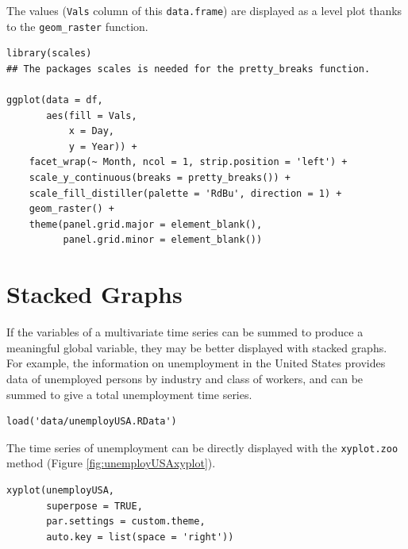 \documentclass[smallroyalvopaper]{memoir}
\begin{document}
The values (\texttt{Vals} column of this \texttt{data.frame}) are displayed as a level plot thanks to the \texttt{geom\_raster} function.
\lstset{language=r,label= ,caption= ,captionpos=b,numbers=none}
\begin{lstlisting}
library(scales) 
## The packages scales is needed for the pretty_breaks function.

ggplot(data = df,
       aes(fill = Vals,
           x = Day,
           y = Year)) +
    facet_wrap(~ Month, ncol = 1, strip.position = 'left') +
    scale_y_continuous(breaks = pretty_breaks()) + 
    scale_fill_distiller(palette = 'RdBu', direction = 1) + 
    geom_raster() +
    theme(panel.grid.major = element_blank(),
          panel.grid.minor = element_blank())
\end{lstlisting}



\section{Stacked Graphs \label{sec:stacked}}
\label{sec:org5cfe655}
If the variables of a multivariate time series can be summed to
produce a meaningful global variable, they may be better displayed
with stacked graphs. For example, the information on unemployment in
the United States provides data of unemployed persons by industry and
class of workers, and can be summed to give a total unemployment time
series.

\lstset{language=r,label= ,caption= ,captionpos=b,numbers=none}
\begin{lstlisting}
load('data/unemployUSA.RData')
\end{lstlisting}

The time series of unemployment can be directly displayed
with the \texttt{xyplot.zoo} method (Figure \ref{fig:unemployUSAxyplot}).

\lstset{language=r,label= ,caption= ,captionpos=b,numbers=none}
\begin{lstlisting}
xyplot(unemployUSA,
       superpose = TRUE,
       par.settings = custom.theme,
       auto.key = list(space = 'right'))
\end{lstlisting}
\end{document}
